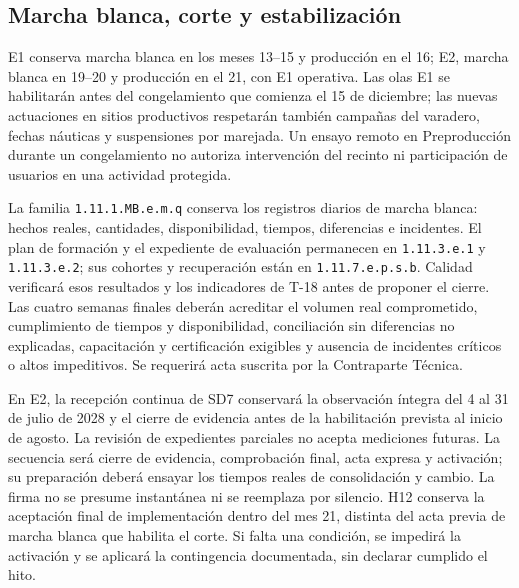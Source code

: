 \subsection{Marcha blanca, corte y estabilización}
E1 conserva marcha blanca en los meses 13--15 y producción en el 16; E2, marcha blanca en 19--20 y producción en el 21, con E1 operativa. Las olas E1 se habilitarán antes del congelamiento que comienza el 15 de diciembre; las nuevas actuaciones en sitios productivos respetarán también campañas del varadero, fechas náuticas y suspensiones por marejada. Un ensayo remoto en Preproducción durante un congelamiento no autoriza intervención del recinto ni participación de usuarios en una actividad protegida. \parencites[sec.~7.3, Estrategia progresiva y autoridad de registro]{sd9-sd7}[cap.~15, RT-10.05, p.~35]{sd9-c07}

La familia \texttt{1.11.1.MB.e.m.q} conserva los registros diarios de marcha blanca: hechos reales, cantidades, disponibilidad, tiempos, diferencias e incidentes. El plan de formación y el expediente de evaluación permanecen en \texttt{1.11.3.e.1} y \texttt{1.11.3.e.2}; sus cohortes y recuperación están en \texttt{1.11.7.e.p.s.b}. Calidad verificará esos resultados y los indicadores de T-18 antes de proponer el cierre. Las cuatro semanas finales deberán acreditar el volumen real comprometido, cumplimiento de tiempos y disponibilidad, conciliación sin diferencias no explicadas, capacitación y certificación exigibles y ausencia de incidentes críticos o altos impeditivos. Se requerirá acta suscrita por la Contraparte Técnica. \parencites[art.~17.3, p.~13]{sd9-ba}[sec.~7.2, Capacitación, evaluación y preparación por sitio; sec.~7.3, Condiciones de avance y cierre de marcha blanca]{sd9-sd7}

En E2, la recepción continua de SD7 conservará la observación íntegra del 4 al 31 de julio de 2028 y el cierre de evidencia antes de la habilitación prevista al inicio de agosto. La revisión de expedientes parciales no acepta mediciones futuras. La secuencia será cierre de evidencia, comprobación final, acta expresa y activación; su preparación deberá ensayar los tiempos reales de consolidación y cambio. La firma no se presume instantánea ni se reemplaza por silencio. H12 conserva la aceptación final de implementación dentro del mes 21, distinta del acta previa de marcha blanca que habilita el corte. Si falta una condición, se impedirá la activación y se aplicará la contingencia documentada, sin declarar cumplido el hito. \parencite[sec.~7.3, Recepción continua seleccionada de E2]{sd9-sd7}

